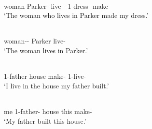 \begin{exe}\ex\label{MojRelSubj}
\begin{xlist}
\ex\gll  {\rm[}  \textipa{k\super{w}-n\super{y}avay{\rm]}-n\super{y}-\v c}  \\
\hspaceThis{[}woman Parker \relativ{}-live-\dem{}-\nom{} 1-dress-\dem{} make-\tns{}\\
\glt `The woman who lives in Parker made my dress.'

\ex\gll{}  \\
woman-\dem{}-\nom{} Parker live-\tns{}\\
\glt `The woman lives in Parker.'
\end{xlist}
\enlargethispage{\baselineskip}
\ex\label{MojRelSub}
\begin{xlist}
\ex\gll  {\rm[}  \textipa{u:\v co:}{\rm]} \\
\hspaceThis{[}1-father house make-\loc{} 1-live-\tns{}\\
\glt `I live in the house my father built.'

\ex\gll {}    \\
me 1-father-\nom{} house this make-\tns{}\\
\glt `My father built this house.'
\end{xlist}
\end{exe} 



